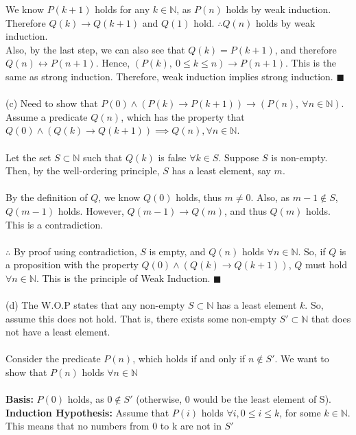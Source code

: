 \documentclass[a4paper]{article}
\begin{document}
\begin{enumerate}
We know $P(k+1)$ holds for any $k \in \mathbb{N}$, as $P(n)$ holds by weak induction. Therefore $Q(k) \rightarrow Q(k+1)$ and $Q(1)$ hold. $\therefore Q(n)$ holds by weak induction.\\

Also, by the last step, we can also see that $Q(k) = P(k+1)$, and therefore $Q(n) \leftrightarrow P(n+1)$. Hence, $(P(k),\ 0 \leq k \leq n) \rightarrow P(n+1)$. This is the same as strong induction. Therefore, weak induction implies strong induction. $\blacksquare$\\
\\
(c) Need to show that $P(0) \land (P(k) \rightarrow P(k+1)) \rightarrow (P(n),\ \forall n \in \mathbb{N})$.\\
Assume a predicate $Q(n)$, which has the property that $Q(0) \land (Q(k) \rightarrow Q(k+1)) \implies Q(n), \forall n \in \mathbb{N}$.\\
\\
Let the set $S \subset \mathbb{N}$ such that $Q(k)$ is false $\forall k \in S$. Suppose $S$ is non-empty. Then, by the well-ordering principle, $S$ has a least element, say $m$.\\
\\
By the definition of $Q$, we know $Q(0)$ holds, thus $m \neq 0$. Also, as $m - 1 \notin S$, $Q(m-1)$ holds. However, $Q(m-1) \rightarrow Q(m)$, and thus $Q(m)$ holds. This is a contradiction.\\
\\
$\therefore$ By proof using contradiction, $S$ is empty, and $Q(n)$ holds $\forall n \in \mathbb{N}$. So, if $Q$ is a proposition with the property $Q(0) \land (Q(k) \rightarrow Q(k+1))$, $Q$ must hold $\forall n \in \mathbb{N}$. This is the principle of Weak Induction. $\blacksquare$\\
\\
(d) The W.O.P states that any non-empty $S \subset \mathbb{N}$ has a least element $k$. So, assume this does not hold. That is, there exists some non-empty $S' \subset \mathbb{N}$ that does not have a least element.\\
\\
Consider the predicate $P(n)$, which holds if and only if $n \notin S'$. We want to show that $P(n)$ holds $\forall n \in \mathbb{N}$\\
\\
\textbf{Basis:} $P(0)$ holds, as $0 \notin S'$ (otherwise, 0 would be the least element of S).\\
\textbf{Induction Hypothesis:} Assume that $P(i)$ holds $\forall i, 0 \leq i \leq k$, for some $k \in \mathbb{N}$. This means that no numbers from 0 to k are not in $S'$\\

\end{enumerate}
\end{document}
